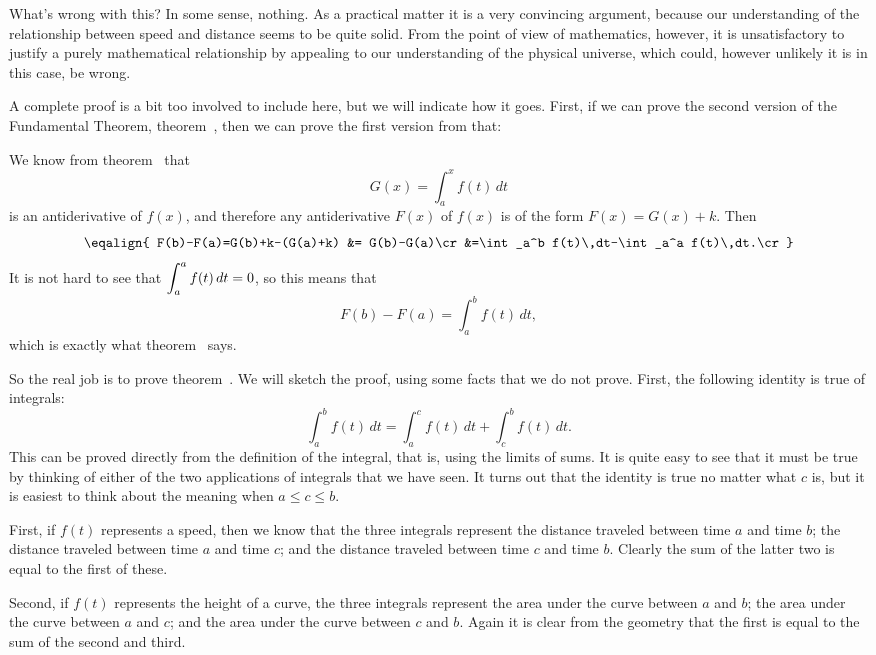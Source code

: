What's wrong with this? In some sense, nothing. As a practical matter
it is a very convincing argument, because our understanding of the
relationship between speed and distance seems to be quite solid. From
the point of view of mathematics, however, it is unsatisfactory to
justify a purely mathematical relationship by appealing to our
understanding of the physical universe, which could, however unlikely
it is in this case, be wrong.

A complete proof is a bit too involved to include here, but we will
indicate how it goes. First, if we can prove the second version of the
Fundamental Theorem, theorem~, then
we can prove the first version from that:

We know from theorem~ that 
$$
  G(x)=\int_a^x f(t)\,dt
$$
is an antiderivative of $f(x)$, and therefore any antiderivative
$F(x)$ of $f(x)$ is of the form $F(x)=G(x)+k$. Then 
$$\eqalign{
  F(b)-F(a)=G(b)+k-(G(a)+k) &= G(b)-G(a)\cr
  &=\int_a^b f(t)\,dt-\int_a^a f(t)\,dt.\cr
}$$
It is not hard to see that $\displaystyle \int_a^a f(t)\,dt=0$, so this means that
$$
  F(b)-F(a)=\int_a^b f(t)\,dt,
$$
which is exactly what theorem~ says.
\endproof

So the real job is to prove
theorem~. We will sketch the proof,
using some facts that we do not prove. First, the following identity
is true of integrals:
$$
  \int_a^b f(t)\,dt = \int_a^c f(t)\,dt + \int_c^b f(t)\,dt.
$$
This can be proved directly from the definition of the integral, that
is, using the limits of sums. It is quite easy to see that it must be
true by thinking of either of the two applications of integrals that
we have seen. It turns out that the identity is true no matter what
$c$ is, but it is easiest to think about the meaning when 
$a\le c\le b$.

First, if $f(t)$ represents a speed, then we know that the three
integrals represent the distance traveled between time $a$ and time $b$;
the distance traveled between time $a$ and time $c$; and 
the distance traveled between time $c$ and time $b$. Clearly the sum of
the latter two is equal to the first of these.

Second, if $f(t)$ represents the height of a curve, the three
integrals represent the area under the curve between $a$ and $b$;
the area under the curve between $a$ and $c$;
and the area under the curve between $c$ and $b$. Again it is clear
from the geometry that the first is equal to the sum of the second and
third. 


